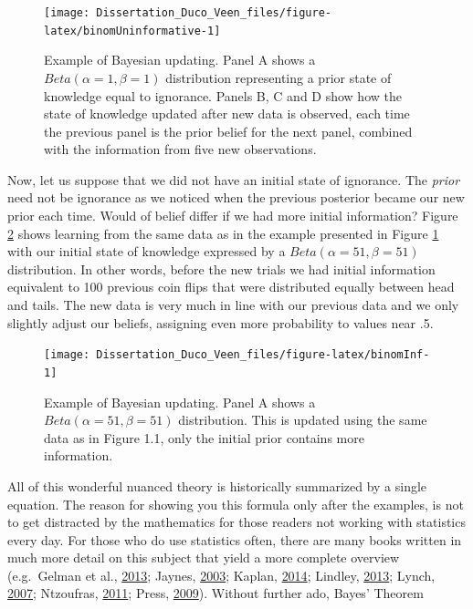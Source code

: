 \documentclass[openright,titlepage,12pt,a4paper]{book}
\begin{document}
\begin{figure}

{\centering \texttt{[image: Dissertation\_Duco\_Veen\_files/figure-latex/binomUninformative-1]} 

}

\caption{Example of Bayesian updating. Panel A shows a $Beta(\alpha = 1, \beta = 1)$ distribution representing a prior state of knowledge equal to ignorance. Panels B, C and D show how the state of knowledge updated after new data is observed, each time the previous panel is the prior belief for the next panel, combined with the information from five new observations.}\label{fig:binomUninformative}
\end{figure}

Now, let us suppose that we did not have an initial state of ignorance. The \emph{prior} need not be ignorance as we noticed when the previous posterior became our new prior each time. Would of belief differ if we had more initial information? Figure \ref{fig:binomInf} shows learning from the same data as in the example presented in Figure \ref{fig:binomUninformative} with our initial state of knowledge expressed by a \(Beta(\alpha = 51, \beta = 51)\) distribution. In other words, before the new trials we had initial information equivalent to 100 previous coin flips that were distributed equally between head and tails. The new data is very much in line with our previous data and we only slightly adjust our beliefs, assigning even more probability to values near .5.

\begin{figure}

{\centering \texttt{[image: Dissertation\_Duco\_Veen\_files/figure-latex/binomInf-1]} 

}

\caption{Example of Bayesian updating. Panel A shows a $Beta(\alpha = 51, \beta = 51)$ distribution. This is updated using the same data as in Figure 1.1, only the initial prior contains more information.}\label{fig:binomInf}
\end{figure}

All of this wonderful nuanced theory is historically summarized by a single equation. The reason for showing you this formula only after the examples, is not to get distracted by the mathematics for those readers not working with statistics every day. For those who do use statistics often, there are many books written in much more detail on this subject that yield a more complete overview (e.g.~Gelman et al., \protect\hyperlink{ref-gelman_bayesian_2013}{2013}; Jaynes, \protect\hyperlink{ref-jaynes_probability_2003}{2003}; Kaplan, \protect\hyperlink{ref-kaplan_bayesian_2014}{2014}; Lindley, \protect\hyperlink{ref-lindley_understanding_2013}{2013}; Lynch, \protect\hyperlink{ref-lynch_introduction_2007}{2007}; Ntzoufras, \protect\hyperlink{ref-ntzoufras_bayesian_2011}{2011}; Press, \protect\hyperlink{ref-press_subjective_2009}{2009}). Without further ado, Bayes' Theorem
\end{document}
